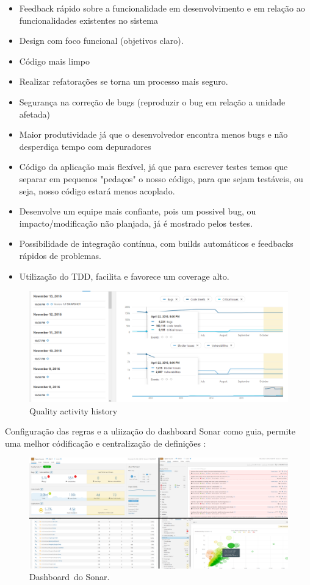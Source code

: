 \documentclass[12pt]{article}
\begin{document}
\begin{itemize}
	\item Feedback rápido sobre a funcionalidade em desenvolvimento e em relação ao funcionalidades existentes no sistema	
	\item Design com foco funcional (objetivos claro).
	\item Código mais limpo
	\item Realizar refatorações se torna um processo mais seguro.
	\item Segurança na correção de bugs (reproduzir o bug em relação a unidade afetada)
	\item Maior produtividade já que o desenvolvedor encontra menos bugs e não desperdiça tempo com depuradores
	\item Código da aplicação mais flexível, já que para escrever testes temos que separar em pequenos "pedaços" o nosso código, para que sejam testáveis, ou seja, nosso código estará menos acoplado.
	\item Desenvolve um equipe mais confiante, pois um possivel bug, ou impacto/modificação não planjada, já é mostrado pelos testes.
	\item Possibilidade de integração contínua, com builds automáticos e feedbacks rápidos de problemas.
	\item Utilização do TDD, facilita e favorece um coverage alto.
\end{itemize}

\begin{figure}[h]
	\centering
		\includegraphics[scale=0.5]{img/img-sonar-report-history.png}
	\caption{Quality activity history}
	\label{fig:sonar-activity-history}
\end{figure}

Configuração das regras e a uliização do dashboard Sonar como guia, permite uma melhor códificação e centralização de definições :

\begin{figure}[h]
	\centering
		\includegraphics[scale=0.25]{img/sonar-dashboard.png}
	\caption{Dashboard\ do Sonar.}
	\label{fig:sonar-dashboard}
\end{figure}
\end{document}
